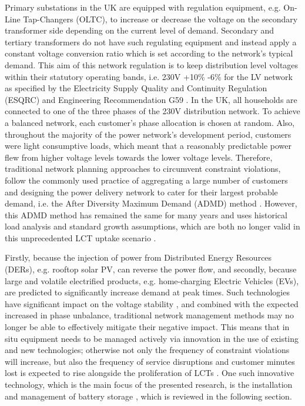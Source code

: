 Primary substations in the UK are equipped with regulation equipment, e.g. On-Line Tap-Changers (OLTC), to increase or decrease the voltage on the secondary transformer side depending on the current level of demand.
Secondary and tertiary transformers do not have such regulating equipment and instead apply a constant voltage conversion ratio which is set according to the network's typical demand.
This aim of this network regulation is to keep distribution level voltages within their statutory operating bands, i.e. 230V +10\% -6\% for the LV network as specified by the Electricity Supply Quality and Continuity Regulation (ESQRC) \cite{HealthandSafetyExecutive2002} and Engineering Recommendation G59 \cite{EnergyNetworksAssociation2013}.
In the UK, all households are connected to one of the three phases of the 230V distribution network.
To achieve a balanced network, each customer's phase allocation is chosen at random.
Also, throughout the majority of the power network's development period, customers were light consumptive loads, which meant that a reasonably predictable power flew from higher voltage levels towards the lower voltage levels.
Therefore, traditional network planning approaches to circumvent constraint violations, follow the commonly used practice of aggregating a large number of customers and designing the power delivery network to cater for their largest probable demand, i.e. the After Diversity Maximum Demand (ADMD) method \cite{Richardson2010a}.
However, this ADMD method has remained the same for many years and uses historical load analysis and standard growth assumptions, which are both no longer valid in this unprecedented LCT uptake scenario \cite{Yunusov2016}.

Firstly, because the injection of power from Distributed Energy Resources (DERs), e.g. rooftop solar PV, can reverse the power flow, and secondly, because large and volatile electrified products, e.g. home-charging Electric Vehicles (EVs), are predicted to significantly increase demand at peak times.
Such technologies have significant impact on the voltage stability \cite{Petinrin2016}, and combined with the expected increased in phase unbalance, traditional network management methods may no longer be able to effectively mitigate their negative impact.
This means that in situ equipment needs to be managed actively via innovation in the use of existing and new technologies; otherwise not only the frequency of constraint violations will increase, but also the frequency of service disruptions and customer minutes lost is expected to rise alongside the proliferation of LCTs \cite{Ault2008a}.
One such innovative technology, which is the main focus of the presented research, is the installation and management of battery storage \cite{Chen2009}, which is reviewed in the following section.















